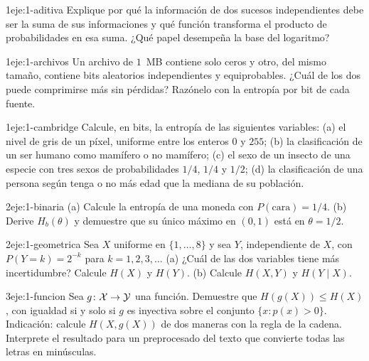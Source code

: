 \begin{ejercicio}{1}{eje:1-aditiva}
Explique por qué la información de dos sucesos independientes debe ser la suma de sus informaciones y qué función transforma el producto de probabilidades en esa suma. ¿Qué papel desempeña la base del logaritmo?
\end{ejercicio}

\begin{ejercicio}{1}{eje:1-archivos}
Un archivo de $1$~MB contiene solo ceros y otro, del mismo tamaño, contiene bits aleatorios independientes y equiprobables. ¿Cuál de los dos puede comprimirse más sin pérdidas? Razónelo con la entropía por bit de cada fuente.
\end{ejercicio}

\begin{ejercicio}{1}{eje:1-cambridge}
Calcule, en bits, la entropía de las siguientes variables: (a) el nivel de gris de un píxel, uniforme entre los enteros $0$ y $255$; (b) la clasificación de un ser humano como mamífero o no mamífero; (c) el sexo de un insecto de una especie con tres sexos de probabilidades $1/4$, $1/4$ y $1/2$; (d) la clasificación de una persona según tenga o no más edad que la mediana de su población.
\end{ejercicio}

\begin{ejercicio}{2}{eje:1-binaria}
(a) Calcule la entropía de una moneda con $P(\text{cara})=1/4$. (b) Derive $H_b(\theta)$ y demuestre que su único máximo en $(0,1)$ está en $\theta=1/2$.
\end{ejercicio}

\begin{ejercicio}{2}{eje:1-geometrica}
Sea $X$ uniforme en $\{1,\dots,8\}$ y sea $Y$, independiente de $X$, con $P(Y=k)=2^{-k}$ para $k=1,2,3,\dots$ (a) ¿Cuál de las dos variables tiene más incertidumbre? Calcule $H(X)$ y $H(Y)$. (b) Calcule $H(X,Y)$ y $H(Y\mid X)$.
\end{ejercicio}

\begin{ejercicio}{3}{eje:1-funcion}
Sea $g\colon\mathcal{X}\to\mathcal{Y}$ una función. Demuestre que $H(g(X))\le H(X)$, con igualdad si y solo si $g$ es inyectiva sobre el conjunto $\{x:p(x)>0\}$. Indicación: calcule $H(X,g(X))$ de dos maneras con la regla de la cadena. Interprete el resultado para un preprocesado del texto que convierte todas las letras en minúsculas.
\end{ejercicio}
